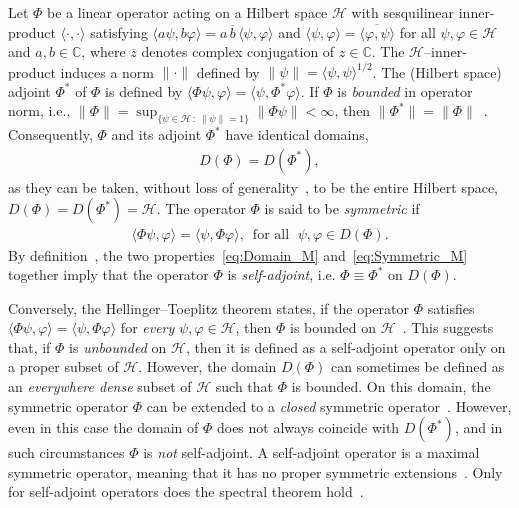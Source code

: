 \documentclass[leqno,onefignum,onetabnum]{siamltex1213}
\newcommand{\Hs}{\mathscr{H}}
\begin{document}
Let $\Phi$ be a linear operator acting on a Hilbert space $\Hs$ with
sesquilinear inner-product $\langle\cdot,\cdot\rangle$ satisfying
$\langle a\psi,b\varphi\rangle=a\,\overline{b}\,\langle\psi,\varphi\rangle$ and $\langle\psi,\varphi\rangle=\overline{\langle\varphi,\psi\rangle}$ for all
$\psi,\varphi\in\Hs$ and $a,b\in\mathbb{C}$, where $\overline{z}$ denotes complex
conjugation of $z\in\mathbb{C}$. The $\Hs$--inner-product induces a norm $\|\cdot\|$
defined by $\|\psi\|=\langle\psi,\psi\rangle^{1/2}$. The (Hilbert space) adjoint $\Phi^*$ of $\Phi$
is defined by $\langle\Phi\psi,\varphi\rangle=\langle\psi,\Phi^*\varphi\rangle$. If $\Phi$ is \emph{bounded}
in operator norm,
i.e., $\|\Phi\|=\sup_{\{\psi\in\Hs \,:\, \|\psi\|=1\}}\|\Phi\psi\|<\infty$, then
$\|\Phi^*\|=\|\Phi\|$~\cite{Reed-1980}. Consequently, $\Phi$ and its adjoint $\Phi^*$
have identical domains,          
%
\begin{align}\label{eq:Domain_M}
  D(\Phi)=D(\Phi^*),
\end{align}
%
as they can be taken, without loss of
generality~\cite{Stakgold:BVP:2000}, to be the entire Hilbert space,
$D(\Phi)=D(\Phi^*)=\Hs$. The operator $\Phi$ is said to be \emph{symmetric}
if~\cite{Reed-1980}     
% 
\begin{align}\label{eq:Symmetric_M}
  \langle\Phi\psi,\varphi\rangle=\langle\psi,\Phi\varphi\rangle,
  \, \text{ for all } \; \psi,\varphi\in D(\Phi).
\end{align}
%
By definition~\cite{Reed-1980,Stone:64}, the two
properties~\eqref{eq:Domain_M} and~\eqref{eq:Symmetric_M} together
imply that the operator $\Phi$ is \emph{self-adjoint}, i.e. $\Phi\equiv\Phi^*$
on $D(\Phi)$. 





Conversely, the Hellinger--Toeplitz theorem states, if the operator
$\Phi$ satisfies $\langle\Phi\psi,\varphi\rangle=\langle\psi,\Phi\varphi\rangle$ for \emph{every} $\psi,\varphi\in\Hs$, then
$\Phi$ is bounded on $\Hs$~\cite{Reed-1980}. This suggests that, if $\Phi$
is \emph{unbounded} on $\Hs$, then it is defined as a self-adjoint
operator only on a proper subset of $\Hs$. However, the domain $D(\Phi)$
can sometimes be defined as an \emph{everywhere dense} subset of $\Hs$
such that $\Phi$ is bounded. On this domain, the symmetric
operator $\Phi$ can be extended to a \emph{closed} symmetric
operator~\cite{Reed-1980,Stone:64}. However, even in this case the
domain of $\Phi$ does not always coincide with $D(\Phi^*)$, and in such
circumstances $\Phi$ is \emph{not} self-adjoint. A self-adjoint operator
is a maximal symmetric operator, meaning that it has  no proper symmetric
extensions~\cite{Stone:64}. Only for self-adjoint operators does the
spectral theorem hold~\cite{Reed-1980,Stone:64}.  
\end{document}
